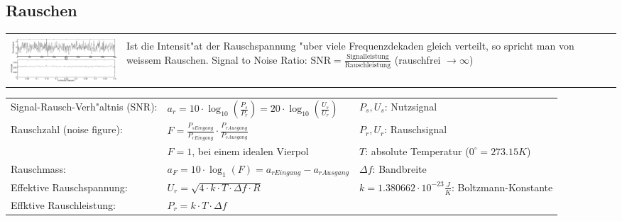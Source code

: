 \subsection{Rauschen }
\begin{tabular}{ll}
	& \matlab{randn} \\
\parbox{7cm}{
	\includegraphics[width=7cm]{./bilder/rauschen.png}
	}
	& \parbox{11cm}{
	Ist die Intensit"at der
	Rauschspannung "uber viele Frequenzdekaden
	gleich verteilt, so spricht man von weissem Rauschen. \\
	Signal to Noise Ratio: $\text{SNR} =
	\frac{\text{Signalleistung}}{\text{Rauschleistung}}$ (rauschfrei $ \rightarrow
	\infty$) \\ 
	}
\end{tabular}

\begin{tabular}{lll}
	Signal-Rausch-Verh"altnis (SNR): &
	$a_r = 10\cdot \log_{10}(\frac{P_s}{P_r}) = 20\cdot \log_{10}(\frac{U_s}{U_r})$ &
	$P_s,U_s$: Nutzsignal\\
	
	Rauschzahl (noise figure): &
	$F = \frac{P_{sEingang}}{P_{rEingang}}\cdot\frac{P_{rAusgang}}{P_{sAusgang}}$ &
	$P_r, U_r$: Rauschsignal\\
	& $F=1$, bei einem idealen Vierpol &
	$T$: absolute Temperatur ($0^{\circ} = 273.15K$)\\
	
	Rauschmass: &
	$a_F = 10 \cdot \log_1(F) = a_{rEingang} - a_{rAusgang}$ & 
	$\Delta f$: Bandbreite\\
	
	Effektive Rauschspannung: &
	$U_r = \sqrt { 4 \cdot k \cdot T \cdot \Delta f \cdot R}$ & 
	$k = 1.380662\cdot 10^{-23}\frac{J}{K}$: Boltzmann-Konstante\\
	
	Effktive Rauschleistung: &
	$P_r = k \cdot T \cdot \Delta f$ & \\
\end{tabular}

